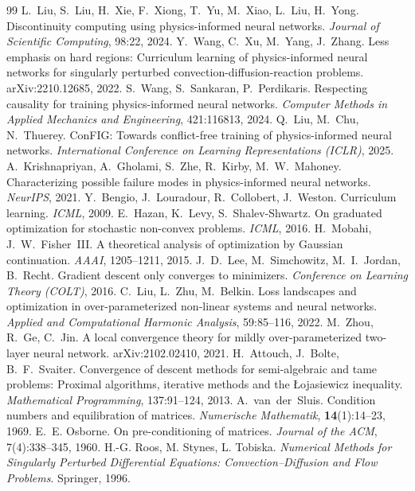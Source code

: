 \documentclass[fontset=windows,11pt]{ctexart}
\numberwithin{equation}{section}
\begin{document}
\begin{thebibliography}{99}
 L.~Liu, S.~Liu, H.~Xie, F.~Xiong, T.~Yu, M.~Xiao, L.~Liu, H.~Yong. Discontinuity computing using physics-informed neural networks. \emph{Journal of Scientific Computing}, 98:22, 2024.
 Y.~Wang, C.~Xu, M.~Yang, J.~Zhang. Less emphasis on hard regions: Curriculum learning of physics-informed neural networks for singularly perturbed convection-diffusion-reaction problems. arXiv:2210.12685, 2022.
 S.~Wang, S.~Sankaran, P.~Perdikaris. Respecting causality for training physics-informed neural networks. \emph{Computer Methods in Applied Mechanics and Engineering}, 421:116813, 2024.
 Q.~Liu, M.~Chu, N.~Thuerey. ConFIG: Towards conflict-free training of physics-informed neural networks. \emph{International Conference on Learning Representations (ICLR)}, 2025.
 A.~Krishnapriyan, A.~Gholami, S.~Zhe, R.~Kirby, M.~W.~Mahoney. Characterizing possible failure modes in physics-informed neural networks. \emph{NeurIPS}, 2021.
 Y.~Bengio, J.~Louradour, R.~Collobert, J.~Weston. Curriculum learning. \emph{ICML}, 2009.
 E.~Hazan, K.~Levy, S.~Shalev-Shwartz. On graduated optimization for stochastic non-convex problems. \emph{ICML}, 2016.
 H.~Mobahi, J.~W.~Fisher~III. A theoretical analysis of optimization by Gaussian continuation. \emph{AAAI}, 1205--1211, 2015.
 J.~D.~Lee, M.~Simchowitz, M.~I.~Jordan, B.~Recht. Gradient descent only converges to minimizers. \emph{Conference on Learning Theory (COLT)}, 2016.
 C.~Liu, L.~Zhu, M.~Belkin. Loss landscapes and optimization in over-parameterized non-linear systems and neural networks. \emph{Applied and Computational Harmonic Analysis}, 59:85--116, 2022.
 M.~Zhou, R.~Ge, C.~Jin. A local convergence theory for mildly over-parameterized two-layer neural network. arXiv:2102.02410, 2021.
 H.~Attouch, J.~Bolte, B.~F.~Svaiter. Convergence of descent methods for semi-algebraic and tame problems: Proximal algorithms, iterative methods and the {\L}ojasiewicz inequality. \emph{Mathematical Programming}, 137:91--124, 2013.
 A.~van~der~Sluis. Condition numbers and equilibration of matrices. \emph{Numerische Mathematik}, \textbf{14}(1):14--23, 1969.
 E.~E. Osborne. On pre-conditioning of matrices. \emph{Journal of the ACM}, 7(4):338--345, 1960.
 H.-G. Roos, M. Stynes, L. Tobiska. \emph{Numerical Methods for Singularly Perturbed Differential Equations: Convection--Diffusion and Flow Problems}. Springer, 1996.

\end{thebibliography}
\end{document}
